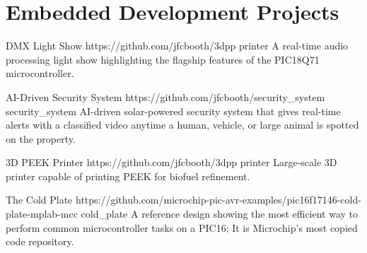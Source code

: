 \documentclass[
	10pt, %
]{FreemanCV}
\begin{document}

\vspace*{-10pt}
\section{Embedded Development Projects}

\begin{paracol}{4} %

\project
	{DMX Light Show} %
	{https://github.com/jfcbooth/3dpp} %
	{printer} %
	{ %
		A real-time audio processing light show highlighting the flagship features of the PIC18Q71 microcontroller.
	}

\switchcolumn

\project
	{AI-Driven Security System} %
	{https://github.com/jfcbooth/security_system} %
	{security_system} %
	{ %
	AI-driven solar-powered security system that gives real-time alerts with a classified video anytime a human, vehicle, or large animal is spotted
	on the property.
	}


\switchcolumn

\project
	{3D PEEK Printer} %
	{https://github.com/jfcbooth/3dpp} %
	{printer} %
	{ %
	Large-scale 3D printer capable of printing PEEK for biofuel refinement.
	}

\switchcolumn

\project
	{The Cold Plate} %
	{https://github.com/microchip-pic-avr-examples/pic16f17146-cold-plate-mplab-mcc} %
	{cold_plate} %
	{ %
	A reference design showing the most efficient way to perform common microcontroller tasks on a PIC16;
It is Microchip's most copied code repository.
	}

\end{paracol}



\end{document}
